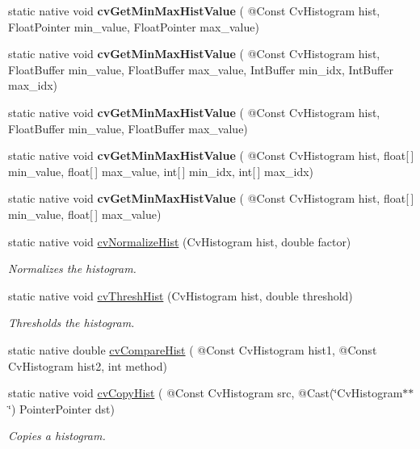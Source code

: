 \begin{DoxyCompactItemize}
static native void {\bfseries cv\+Get\+Min\+Max\+Hist\+Value} ( @Const Cv\+Histogram hist, Float\+Pointer min\+\_\+value, Float\+Pointer max\+\_\+value)
\item 
static native void {\bfseries cv\+Get\+Min\+Max\+Hist\+Value} ( @Const Cv\+Histogram hist, Float\+Buffer min\+\_\+value, Float\+Buffer max\+\_\+value, Int\+Buffer min\+\_\+idx, Int\+Buffer max\+\_\+idx)
\item 
static native void {\bfseries cv\+Get\+Min\+Max\+Hist\+Value} ( @Const Cv\+Histogram hist, Float\+Buffer min\+\_\+value, Float\+Buffer max\+\_\+value)
\item 
static native void {\bfseries cv\+Get\+Min\+Max\+Hist\+Value} ( @Const Cv\+Histogram hist, float\mbox{[}$\,$\mbox{]} min\+\_\+value, float\mbox{[}$\,$\mbox{]} max\+\_\+value, int\mbox{[}$\,$\mbox{]} min\+\_\+idx, int\mbox{[}$\,$\mbox{]} max\+\_\+idx)
\item 
static native void {\bfseries cv\+Get\+Min\+Max\+Hist\+Value} ( @Const Cv\+Histogram hist, float\mbox{[}$\,$\mbox{]} min\+\_\+value, float\mbox{[}$\,$\mbox{]} max\+\_\+value)
\item 
static native void \hyperlink{group__imgproc__c_gaae040215ddf5f0582fd04464ea27495f}{cv\+Normalize\+Hist} (Cv\+Histogram hist, double factor)
\begin{DoxyCompactList}\small\item\em Normalizes the histogram. \end{DoxyCompactList}\item 
static native void \hyperlink{group__imgproc__c_ga1c1fb991e209c208c788ade579aacc5a}{cv\+Thresh\+Hist} (Cv\+Histogram hist, double threshold)
\begin{DoxyCompactList}\small\item\em Thresholds the histogram. \end{DoxyCompactList}\item 
static native double \hyperlink{group__imgproc__c_gae639bb492f6f6f8434a3bf4a6ae085c9}{cv\+Compare\+Hist} ( @Const Cv\+Histogram hist1, @Const Cv\+Histogram hist2, int method)
\item 
static native void \hyperlink{group__imgproc__c_ga8d6e92f294d7853bc6a9435443b56c5d}{cv\+Copy\+Hist} ( @Const Cv\+Histogram src, @Cast(\char`\"{}Cv\+Histogram$\ast$$\ast$\char`\"{}) Pointer\+Pointer dst)
\begin{DoxyCompactList}\small\item\em Copies a histogram. \end{DoxyCompactList}\item 
$$
\end{DoxyCompactItemize}
